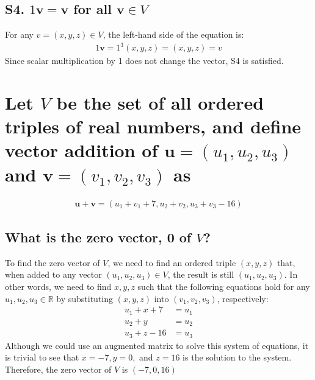 \documentclass[
  letterpaper,
  DIV=11,
  numbers=noendperiod]{scrartcl}
\begin{document}
\subsection{\texorpdfstring{S4. \(1\mathbf{v} = \mathbf{v}\) for all
\(\mathbf{v} \in V\)}{S4. 1\textbackslash mathbf\{v\} = \textbackslash mathbf\{v\} for all \textbackslash mathbf\{v\} \textbackslash in V}}\label{s4.-1mathbfv-mathbfv-for-all-mathbfv-in-v}

For any \(v = (x, y, z) \in V\), the left-hand side of the equation is:
\begin{align*}
1\mathbf{v} = 1^3(x, y, z) = (x, y, z) = v
\end{align*} Since scalar multiplication by 1 does not change the
vector, S4 is satisfied.

\newpage{}

\section{\texorpdfstring{Let \(V\) be the set of all ordered triples of
real numbers, and define vector addition of
\(\mathbf{u} = (u_1, u_2, u_3)\) and \(\mathbf{v} = (v_1, v_2, v_3)\)
as}{Let V be the set of all ordered triples of real numbers, and define vector addition of \textbackslash mathbf\{u\} = (u\_1, u\_2, u\_3) and \textbackslash mathbf\{v\} = (v\_1, v\_2, v\_3) as}}\label{let-v-be-the-set-of-all-ordered-triples-of-real-numbers-and-define-vector-addition-of-mathbfu-u_1-u_2-u_3-and-mathbfv-v_1-v_2-v_3-as}

\begin{align*}
\mathbf{u+v} = (u_1+v_1+7, u_2+v_2,u_3+v_3-16)
\end{align*}

\subsection{\texorpdfstring{What is the zero vector, \textbf{0} of
\(V\)?}{What is the zero vector, 0 of V?}}\label{what-is-the-zero-vector-0-of-v}

To find the zero vector of \(V\), we need to find an ordered triple
\((x, y, z)\) that, when added to any vector \((u_1, u_2, u_3) \in V\),
the result is still \((u_1, u_2, u_3)\). In other words, we need to find
\(x, y, z\) such that the following equations hold for any
\(u_1, u_2, u_3 \in \mathbb{R}\) by substituting \((x, y, z)\) into
\((v_1, v_2, v_3)\), respectively: \begin{align*}
u_1 + x + 7 &= u_1 \\
u_2 + y &= u_2 \\ 
u_3 + z - 16 &= u_3
\end{align*} Although we could use an augmented matrix to solve this
system of equations, it is trivial to see that \(x=-7, y=0,\) and
\(z=16\) is the solution to the system. Therefore, the zero vector of
\(V\) is \((-7, 0, 16)\)
\end{document}
